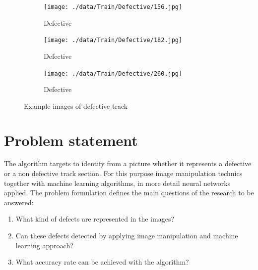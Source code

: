 \documentclass[10pt, final]{article}
\begin{document}
		\begin{figure}[!ht]
			\centering
			\begin{subfigure}{0.3\textwidth}
				\centering
				\texttt{[image: ./data/Train/Defective/156.jpg]}
				\caption{Defective}
			\end{subfigure}
			\begin{subfigure}{0.3\textwidth}
				\centering
				\texttt{[image: ./data/Train/Defective/182.jpg]}
				\caption{Defective}
			\end{subfigure}
			\begin{subfigure}{0.3\textwidth}
				\centering
				\texttt{[image: ./data/Train/Defective/260.jpg]}
				\caption{Defective}
			\end{subfigure}
			\caption{Example images of defective track}
			\label{fig:track_def}
		\end{figure}
	
	\section{Problem statement} \label{sec:prob_stat}
		The algorithm targets to identify from a picture whether it represents a defective or a non defective 
		track section.
		For this purpose image manipulation technics together with machine learning algorithms, in more detail 
		neural networks applied.
		The problem formulation defines the main questions of the research to be answered:
		\begin{enumerate}[label=Q\arabic*]
			\item \label{itm:Q1} What kind of defects are represented in the images?
			\item \label{itm:Q2} Can these defects detected by applying image manipulation 
				and machine learning approach? 
			\item \label{itm:Q3} What accuracy rate can be achieved with the algorithm?
		\end{enumerate}
	
\end{document}
